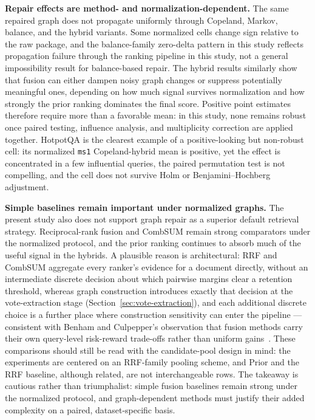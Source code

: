 \documentclass[manuscript,anonymous,review]{acmart}
\begin{document}
\textbf{Repair effects are method- and normalization-dependent.} The same repaired
graph does not propagate uniformly through Copeland, Markov, balance, and the
hybrid variants. Some normalized cells change sign relative to the raw package,
and the balance-family zero-delta pattern in this study reflects propagation
failure through the ranking pipeline in this study, not a general impossibility
result for balance-based repair. The hybrid results similarly show that fusion can
either dampen noisy graph changes or suppress potentially meaningful ones,
depending on how much signal survives normalization and how strongly the prior
ranking dominates the final score. Positive point estimates therefore require
more than a favorable mean: in this study, none remains robust once paired
testing, influence analysis, and multiplicity correction are applied together.
HotpotQA is the clearest example of a positive-looking but non-robust cell: its normalized \texttt{ms1} Copeland-hybrid mean is positive, yet the effect is concentrated in a few influential queries, the paired permutation test is not compelling, and the cell does not survive Holm or Benjamini--Hochberg adjustment.

\textbf{Simple baselines remain important under normalized graphs.} The present
study also does not support graph repair as a superior default retrieval
strategy. Reciprocal-rank fusion and CombSUM remain strong comparators under the
normalized protocol, and the prior ranking continues to absorb much of the
useful signal in the hybrids. A plausible reason is architectural: RRF and
CombSUM aggregate every ranker's evidence for a document directly, without an
intermediate discrete decision about which pairwise margins clear a retention
threshold, whereas graph construction introduces exactly that decision at the
vote-extraction stage (Section~\ref{sec:vote-extraction}), and each additional
discrete choice is a further place where construction sensitivity can enter
the pipeline --- consistent with Benham and Culpepper's observation that
fusion methods carry their own query-level risk-reward trade-offs rather than
uniform gains~\cite{benham2017risk}. These comparisons should still be read
with the candidate-pool design in mind: the experiments are centered on an
RRF-family pooling scheme, and Prior and the RRF baseline, although related,
are not interchangeable rows. The takeaway is cautious rather than
triumphalist: simple fusion baselines remain strong under the normalized
protocol, and graph-dependent methods must justify their added complexity on a
paired, dataset-specific basis.
\end{document}
